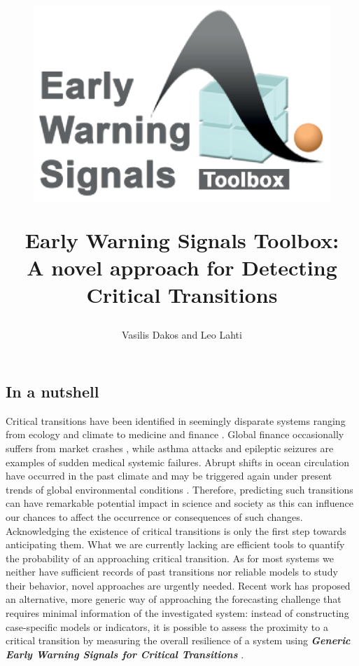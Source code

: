 \documentclass[12pt,a4paper,final]{article}
\author{Vasilis Dakos and Leo Lahti}
\title{
\begin{figure}[h]
\includegraphics[scale=0.5]{logoEWS.eps}
\end{figure}
Early Warning Signals Toolbox:\\ 
A novel approach for Detecting Critical Transitions\\
}
\begin{document}
\date{}
\maketitle

\begin{doublespacing}

\section{In a nutshell} %
Critical transitions have been identified in seemingly disparate systems ranging from ecology and climate to medicine and finance \cite{Scheffer2001a,Scheffer2012}. Global finance occasionally suffers from market crashes \cite{May2008}, while asthma attacks \cite{Venegas2005} and epileptic seizures \cite{McSharry2003,Kramer2012} are examples of sudden medical systemic failures. Abrupt shifts in ocean circulation have occurred in the past climate \cite{Rahmstorf2002} and may be triggered again under present trends of global environmental conditions \cite{Lenton2011}. Therefore, predicting such transitions can have remarkable potential impact in science and society as this can influence our chances to affect the occurrence or consequences of such changes. Acknowledging the existence of critical transitions is only the first step towards anticipating them. What we are currently lacking are efficient tools to quantify the probability of an approaching critical transition. As for most systems we neither have sufficient records of past transitions nor reliable models to study their behavior, novel approaches are urgently needed. Recent work has proposed an alternative, more generic way of approaching the forecasting challenge that requires minimal information of the investigated system: instead of constructing case-specific models or indicators, it is possible to assess the proximity to a critical transition by measuring the overall resilience of a system using \textit{\textbf{Generic Early Warning Signals for Critical Transitions}} \cite{Scheffer2009a}.\\
\\
\\


\end{doublespacing}
\end{document}
